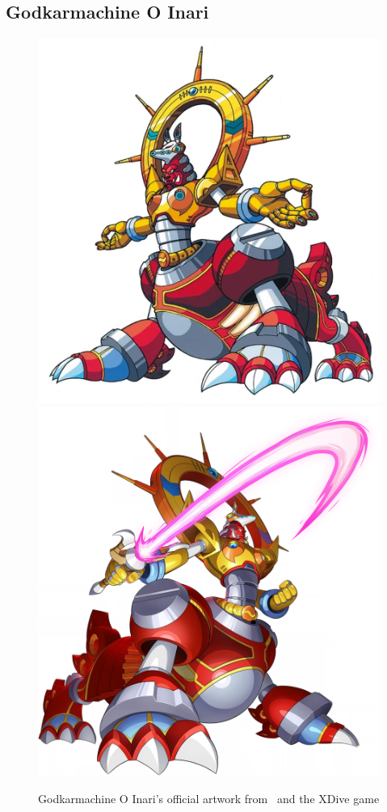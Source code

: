 \subsection{Godkarmachine O Inari}\label{boss:Godkarmachine}
\begin{figure}[htp]
	\centering
	\includegraphics[height=\portraitsize]{figures/X3/Doppler_stages/Godkarmachine.png}
	\includegraphics[height=\portraitsize]{figures/X3/Doppler_stages/Godkarmachine_dive.png}
	\caption{Godkarmachine O Inari's official artwork from~\cite{book:MMX_Complete_art} and the XDive game}
\end{figure}

